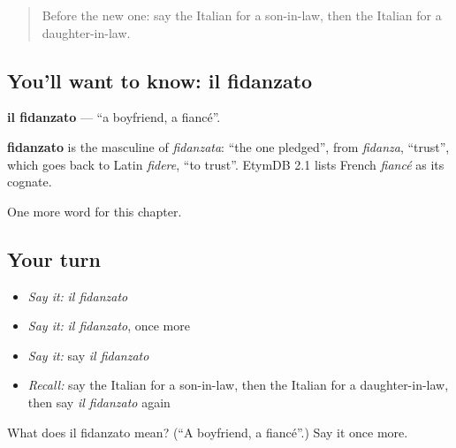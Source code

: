 \begin{quote}
Before the new one: say the Italian for a son-in-law, then the Italian for a daughter-in-law.
\end{quote}

\subsection*{You'll want to know: il fidanzato}
\textbf{il fidanzato} — \textquotedblleft{}a boyfriend, a fiancé\textquotedblright{}.

\begin{cousinweb}
\textbf{fidanzato} is the masculine of \emph{fidanzata}: \textquotedblleft{}the one pledged\textquotedblright{}, from \emph{fidanza}, \textquotedblleft{}trust\textquotedblright{}, which goes back to Latin \emph{fidere}, \textquotedblleft{}to trust\textquotedblright{}. EtymDB 2.1 lists French \emph{fiancé} as its cognate.
\end{cousinweb}

\begin{grammarlens}[title={What you've built}]
One more word for this chapter.
\end{grammarlens}

\subsection*{Your turn}
\begin{itemize}
\raggedright
  \item \emph{Say it:} \emph{il fidanzato}
  \item \emph{Say it:} \emph{il fidanzato}, once more
  \item \emph{Say it:} say \emph{il fidanzato}
  \item \emph{Recall:} say the Italian for a son-in-law, then the Italian for a daughter-in-law, then say \emph{il fidanzato} again
\end{itemize}

\begin{tcolorbox}[breakable,colback=teal!4,colframe=teal!35!black,title={Before you move on}]
What does il fidanzato mean? (\textquotedblleft{}A boyfriend, a fiancé\textquotedblright{}.) Say it once more.
\end{tcolorbox}
